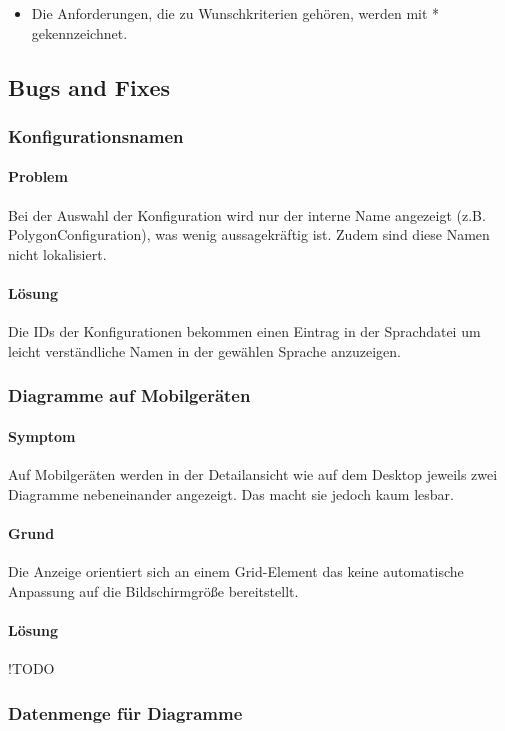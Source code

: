 \begin{itemize}
  \item Die Anforderungen, die zu Wunschkriterien gehören, werden mit * gekennzeichnet.
\end{itemize}

\subsection{Bugs and Fixes}

\subsubsection{Konfigurationsnamen}
\paragraph{Problem}
Bei der Auswahl der Konfiguration wird nur der interne Name angezeigt (z.B. PolygonConfiguration),
was wenig aussagekräftig ist. Zudem sind diese Namen nicht lokalisiert.

\paragraph{Lösung}
Die IDs der Konfigurationen bekommen einen Eintrag in der Sprachdatei um leicht verständliche
Namen in der gewählen Sprache anzuzeigen.

\subsubsection{Diagramme auf Mobilgeräten}
\paragraph{Symptom}
Auf Mobilgeräten werden in der Detailansicht wie auf dem Desktop jeweils zwei Diagramme nebeneinander angezeigt.
Das macht sie jedoch kaum lesbar.

\paragraph{Grund}
Die Anzeige orientiert sich an einem Grid-Element das keine automatische Anpassung auf 
die Bildschirmgröße bereitstellt.

\paragraph{Lösung}
!TODO

\subsubsection{Datenmenge für Diagramme}
